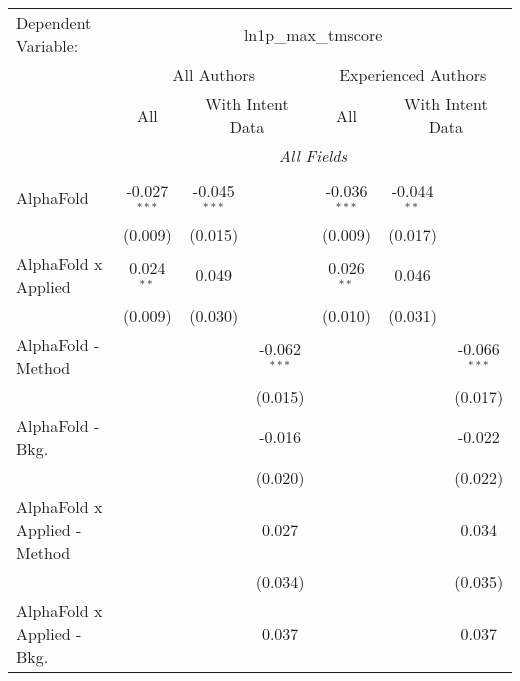 \begingroup
\centering
\begin{tabular}{lcccccc}
   \tabularnewline \midrule \midrule
   Dependent Variable: & \multicolumn{6}{c}{ln1p\_max\_tmscore}\\
 & \multicolumn{3}{c}{All Authors} & \multicolumn{3}{c}{Experienced Authors} \\
\cmidrule(lr){2-4} \cmidrule(lr){5-7}
 & \multicolumn{1}{c}{All} & \multicolumn{2}{c}{With Intent Data} & \multicolumn{1}{c}{All} & \multicolumn{2}{c}{With Intent Data} \\
\cmidrule(lr){2-2} \cmidrule(lr){3-4} \cmidrule(lr){5-5} \cmidrule(lr){6-7}
 & \multicolumn{6}{c}{\textit{All Fields}} \\ \\
   AlphaFold                      & -0.027$^{***}$ & -0.045$^{***}$ &                & -0.036$^{***}$ & -0.044$^{**}$ &   \\   
                                  & (0.009)        & (0.015)        &                & (0.009)        & (0.017)       &   \\   
   AlphaFold x Applied            & 0.024$^{**}$   & 0.049          &                & 0.026$^{**}$   & 0.046         &   \\   
                                  & (0.009)        & (0.030)        &                & (0.010)        & (0.031)       &   \\   
   AlphaFold - Method             &                &                & -0.062$^{***}$ &                &               & -0.066$^{***}$\\   
                                  &                &                & (0.015)        &                &               & (0.017)\\   
   AlphaFold - Bkg.               &                &                & -0.016         &                &               & -0.022\\   
                                  &                &                & (0.020)        &                &               & (0.022)\\   
   AlphaFold x Applied - Method   &                &                & 0.027          &                &               & 0.034\\   
                                  &                &                & (0.034)        &                &               & (0.035)\\   
   AlphaFold x Applied - Bkg.     &                &                & 0.037          &                &               & 0.037\\   

\end{tabular}
